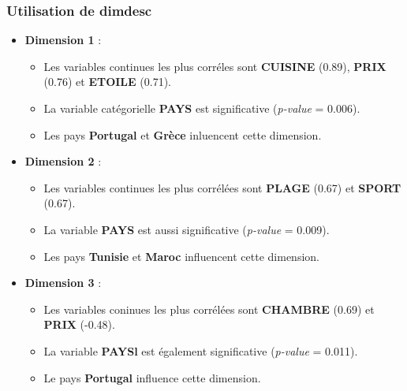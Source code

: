 \documentclass{article}
\begin{document}
    \subsubsection{Utilisation de dimdesc}

    \begin{itemize}
        \item \textbf{Dimension 1} :
        \begin{itemize}
            \item Les variables continues les plus corréles sont \textbf{CUISINE} (0.89), \textbf{PRIX} (0.76) et \textbf{ETOILE} (0.71).
            \item La variable catégorielle \textbf{PAYS} est significative (\textit{p-value} = 0.006).
            \item Les pays \textbf{Portugal} et \textbf{Grèce} inluencent cette dimension.
        \end{itemize}

        \item \textbf{Dimension 2} :
        \begin{itemize}
            \item Les variables continues les plus corrélées sont \textbf{PLAGE} (0.67) et \textbf{SPORT} (0.67).
            \item La variable \textbf{PAYS} est aussi significative (\textit{p-value} = 0.009).
            \item Les pays \textbf{Tunisie} et \textbf{Maroc} influencent cette dimension.
        \end{itemize}

        \item \textbf{Dimension 3} :
        \begin{itemize}
            \item Les variables coninues les plus corrélées sont \textbf{CHAMBRE} (0.69) et \textbf{PRIX} (-0.48).
            \item La variable \textbf{PAYSl} est également significative (\textit{p-value} = 0.011).
            \item Le pays \textbf{Portugal} influence cette dimension.
        \end{itemize}
    \end{itemize}
\end{document}

